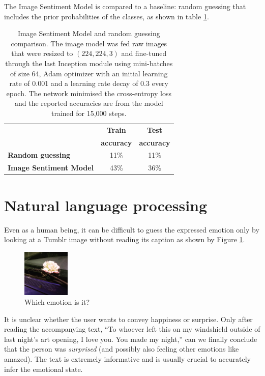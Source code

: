\documentclass{article} %
\begin{document}
The Image Sentiment Model is compared to a baseline: random guessing that includes the prior probabilities of the classes, as shown in table \ref{image-results}.

\begin{table}[H]
\caption{Image Sentiment Model and random guessing comparison. The image model was fed raw images that were resized to $(224, 224, 3)$ and fine-tuned through the last Inception module using mini-batches of size 64, Adam optimizer with an initial learning rate of 0.001 and a learning rate decay of 0.3 every epoch. The network minimised the cross-entropy loss and the reported accuracies are from the model trained for 15,000 steps.}
\begin{center}
    \begin{tabular}{ l | c | c}
    & \textbf{Train} & \textbf{Test} \\
    & \textbf{accuracy} & \textbf{accuracy} \\ \hline
    \textbf{Random guessing} & 11\% & 11\% \\ \hline
    \textbf{Image Sentiment Model}  & 43\% & 36\% \\
    \end{tabular}
\end{center}
\label{image-results}
\end{table}

\section{Natural language processing}
Even as a human being, it can be difficult to guess the expressed emotion only by looking at a Tumblr image without reading its caption as shown by Figure \ref{surprised-unclear}.

\begin{figure}[H]
    \centering
    \includegraphics[width=0.2\textwidth]{Images/flower.jpg}
    \caption{Which emotion is it?}
    \label{surprised-unclear}
\end{figure}

It is unclear whether the user wants to convey happiness or surprise. Only after reading the accompanying text, ``To whoever left this on my windshield outside of last night's art opening, I love you. You made my night,'' can we finally conclude that the person was {\em surprised} (and possibly also feeling other emotions like amazed). The text is extremely informative and is usually crucial to accurately infer the emotional state.
\end{document}
